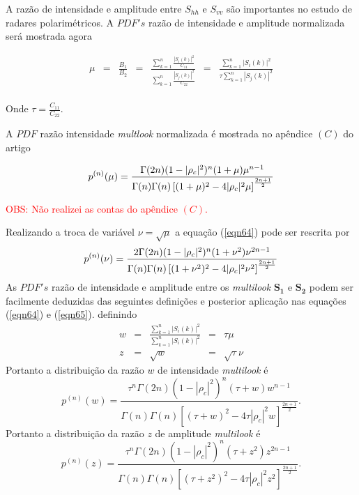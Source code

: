 \documentclass[12pt,a4paper]{article}
\begin{document}
A razão de intensidade e amplitude entre $S_{hh}$ e $S_{vv}$ são importantes no estudo de radares polarimétricos. A $PDF's$ razão de intensidade e amplitude normalizada será mostrada agora

\begin{equation}\label{eqn63}
\begin{array}{ccccccc}
	\mu&=&\frac{B_1}{B_2}&=&\frac{\sum_{k=1}^{n}\frac{|S_i(k)|^2}{C_{11}}}{\sum_{k=1}^{n}\frac{|S_j(k)|^2}{C_{22}}}&=&\frac{\sum_{k=1}^{n}|S_i(k)|^2}{\tau\sum_{k=1}^{n}|S_j(k)|^2}\\
\end{array}
\end{equation}

Onde $\tau=\frac{C_{11}}{C_{22}}$.

A $PDF$ razão intensidade {\it multlook} normalizada é mostrada no apêndice $(C)$ do artigo \cite{lee94}  


\begin{equation}\label{eqn64}
	p^{(n)}(\mu)=\frac{\Gamma(2n)(1-|\rho_c|^2)^{n}(1+\mu)\mu^{n-1}}{\Gamma(n)\Gamma(n)\left[(1+\mu)^2-4|\rho_c|^2\mu \right]^{\frac{2n+1}{2}}}\\
\end{equation}

\textcolor{red}{OBS: Não realizei as contas do apêndice $(C)$.}

Realizando a troca de variável $\nu=\sqrt{\mu}$ a equação (\ref{eqn64}) pode ser rescrita por
\begin{equation}\label{eqn65}
	p^{(n)}(\nu)=\frac{2\Gamma(2n)(1-|\rho_c|^2)^{n}(1+\nu^2)\nu^{2n-1}}{\Gamma(n)\Gamma(n)\left[(1+\nu^2)^2-4|\rho_c|^2\nu^2 \right]^{\frac{2n+1}{2}}}\\
\end{equation}
As $PDF's$ razão de intensidade e amplitude entre os {\it multilook} $\mathbf{S_1}$ e $\mathbf{S_2}$ podem ser facilmente deduzidas das seguintes definições e posterior aplicação nas equações (\ref{eqn64}) e (\ref{eqn65}). definindo 
\begin{equation}\label{eqn66}
\begin{array}{ccccc}
	w&=&\frac{\sum_{k=1}^{n}|S_i(k)|^2}{\sum_{k=1}^{n}|S_i(k)|^2}&=&\tau\mu\\
	z&=&\sqrt{w}&=&\sqrt{\tau}\nu
\end{array}
\end{equation}
Portanto a distribuição da razão $w$ de intensidade {\it multilook} é
\begin{equation}\label{eqn67}
	p^{(n)}(w)=\frac{\tau^{n}\Gamma(2n)(1-|\rho_c|^2)^{n}(\tau+w)w^{n-1}}{\Gamma(n)\Gamma(n)\left[(\tau+w)^2-4\tau|\rho_c|^2w \right]^{\frac{2n+1}{2}}}.
\end{equation}
Portanto a distribuição da razão $z$ de amplitude {\it multilook} é
\begin{equation}\label{eqn68}
	p^{(n)}(z)=\frac{\tau^{n}\Gamma(2n)(1-|\rho_c|^2)^{n}(\tau+z^2)z^{2n-1}}{\Gamma(n)\Gamma(n)\left[(\tau+z^2)^2-4\tau|\rho_c|^2z^2 \right]^{\frac{2n+1}{2}}}.
\end{equation}
\end{document}
